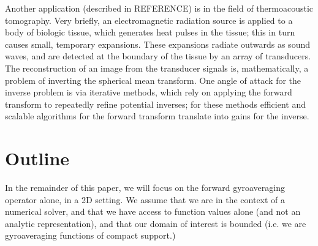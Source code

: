 Another application  (described in REFERENCE) is in the field of thermoacoustic tomography.  Very briefly, an electromagnetic radiation source is applied to a body of biologic tissue, which generates heat pulses in the tissue; this in turn causes small, temporary expansions.  These expansions radiate outwards as sound waves, and are detected at the boundary of the tissue by an array of transducers.  The reconstruction of an image from the transducer signals is, mathematically, a problem of inverting the spherical mean transform.  One angle of attack for the inverse problem is via iterative methods, which rely on applying the forward transform to repeatedly refine potential inverses; for these methods efficient and scalable algorithms for the forward transform translate into gains for the inverse.  




\section{Outline\label{Outline}}
In the remainder of this paper, we will focus on the forward gyroaveraging operator alone, in a 2D setting.  We assume that we are in the context of a numerical solver, and that we have access to function values alone (and not an analytic representation), and that our domain of interest is bounded (i.e. we are gyroaveraging functions of compact support.)  

